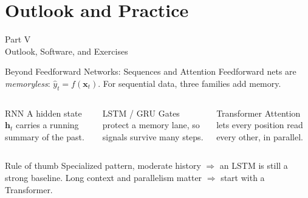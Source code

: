 \documentclass[aspectratio=169,11pt]{beamer}
\newcommand{\x}{\bm{x}}
\begin{document}

\section{Outlook and Practice}

\begin{frame}{}
\begin{center}
{\Huge \textcolor{uzhblue}{Part V}}\\[0.8em]
{\LARGE Outlook, Software, and Exercises}
\end{center}
\end{frame}

\begin{frame}{Beyond Feedforward Networks: Sequences and Attention}
Feedforward nets are \emph{memoryless}: $\hat{y}_t = f(\x_t)$.  For sequential data, three families add memory.

\vspace{0.3cm}
\begin{columns}[T]
\begin{block}{RNN}
A hidden state $\bm{h}_t$ carries a running summary of the past.
\end{block}

\begin{block}{LSTM / GRU}
Gates protect a memory lane, so signals survive many steps.
\end{block}

\begin{block}{Transformer}
Attention lets every position read every other, in parallel.
\end{block}
\end{columns}

\vspace{0.35cm}
\begin{exampleblock}{Rule of thumb}
Specialized pattern, moderate history $\Rightarrow$ an LSTM is still a strong baseline.  Long context and parallelism matter $\Rightarrow$ start with a Transformer.
\end{exampleblock}

\end{frame}
\end{document}
